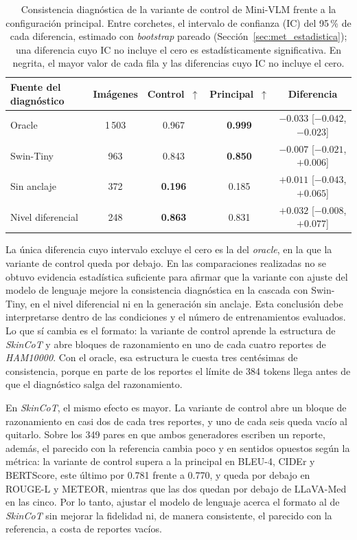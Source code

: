 \begin{table}[H]
    \centering
    \caption{Consistencia diagnóstica de la variante de control de Mini-VLM frente a la configuración principal. Entre corchetes, el intervalo de confianza (IC) del 95\,\% de cada diferencia, estimado con \emph{bootstrap} pareado (Sección~\ref{sec:met_estadistica}); una diferencia cuyo IC no incluye el cero es estadísticamente significativa. En negrita, el mayor valor de cada fila y las diferencias cuyo IC no incluye el cero.}
    \label{tab:res_gen_control}
    \small
    \begin{tabularx}{\textwidth}{@{}>{\raggedright\arraybackslash}X cccc@{}}
        \toprule
        \textbf{Fuente del diagnóstico} & \textbf{Imágenes} & \textbf{Control}~$\uparrow$ & \textbf{Principal}~$\uparrow$
            & \textbf{Diferencia} \\
        \midrule
        Oracle & 1\,503 & 0.967 & \textbf{0.999} & $\mathbf{-0.033}$ [$-0.042$, $-0.023$] \\
        Swin-Tiny & 963 & 0.843 & \textbf{0.850} & $-0.007$ [$-0.021$, $+0.006$] \\
        Sin anclaje & 372 & \textbf{0.196} & 0.185 & $+0.011$ [$-0.043$, $+0.065$] \\
        Nivel diferencial & 248 & \textbf{0.863} & 0.831 & $+0.032$ [$-0.008$, $+0.077$] \\
        \bottomrule
    \end{tabularx}
\end{table}

La única diferencia cuyo intervalo excluye el cero es la del \emph{oracle}, en la que la variante de control queda por
debajo. En las comparaciones realizadas no se obtuvo evidencia estadística suficiente para afirmar que la variante con ajuste del modelo de lenguaje mejore la consistencia diagnóstica en la cascada con Swin-Tiny, en el nivel diferencial ni en la generación sin anclaje. Esta conclusión debe interpretarse dentro de las condiciones y el número de entrenamientos evaluados. Lo que sí cambia es el formato: la variante de control aprende la estructura de
\emph{SkinCoT} y abre bloques de razonamiento en uno de cada cuatro reportes de \emph{HAM10000}. Con el oracle,
esa estructura le cuesta tres centésimas de consistencia, porque en parte de los reportes el límite de 384 tokens llega
antes de que el diagnóstico salga del razonamiento.

En \emph{SkinCoT}, el mismo efecto es mayor. La variante de control abre un bloque de razonamiento en casi dos de cada
tres reportes, y uno de cada seis queda vacío al quitarlo. Sobre los 349 pares en que ambos generadores escriben un
reporte, además, el parecido con la referencia cambia poco y en sentidos opuestos según la métrica: la variante de
control supera a la principal en BLEU-4, CIDEr y BERTScore, este último por 0.781 frente a 0.770, y queda por debajo en ROUGE-L y METEOR,
mientras que las dos quedan por debajo de LLaVA-Med en las cinco. Por lo tanto, ajustar el modelo de lenguaje acerca el
formato al de \emph{SkinCoT} sin mejorar la fidelidad ni, de manera consistente, el parecido con la referencia, a
costa de reportes vacíos.

